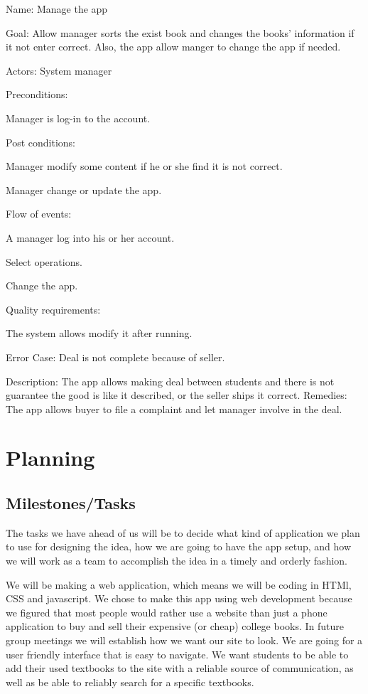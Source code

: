 \documentclass[12pt]{article}
\begin{document}
Name: Manage the app \par
 Goal: Allow manager sorts the exist book and changes the books’ information if it not enter correct. Also, the app allow manger to change the app if needed. \par
Actors: System manager \par
Preconditions: \par
      \quad  	Manager is log-in to the account. \par
Post conditions: \par
       \quad  	Manager modify some content if he or she find it is not correct. \par
     \quad    	Manager change or update the app. \par
Flow of events: \par
      \quad   	A manager log into his or her account. \par
    \quad     	Select operations. \par
    \quad     	Change the app.     \par
Quality requirements: \par
     \quad    	The system allows modify it after running. \par
 
Error Case: Deal is not complete because of seller. \par
Description: The app allows making deal between students and there is not guarantee the good is like it described, or the seller ships it correct.
Remedies: The app allows buyer to file a complaint and let manager involve in the deal.


	\section{Planning}

	
		\subsection{Milestones/Tasks}

    The tasks we have ahead of us will be to decide what kind of application we plan to use for designing the idea, how we are going to have the app setup, and how we will work as a team to accomplish the idea in a timely and orderly fashion. \par
	
	\quad We will be making a web application, which means we will be coding in HTMl, CSS and javascript.  We chose to make this app using web development because we figured that most people would rather use a website than just a phone application to buy and sell their expensive (or cheap) college books. In future group meetings we will establish how we want our site to look. We are going for a user friendly interface that is easy to navigate. We want students to be able to add their used textbooks to the site with a reliable source of communication, as well as be able to reliably search for a specific textbooks. \par
	
\end{document}
